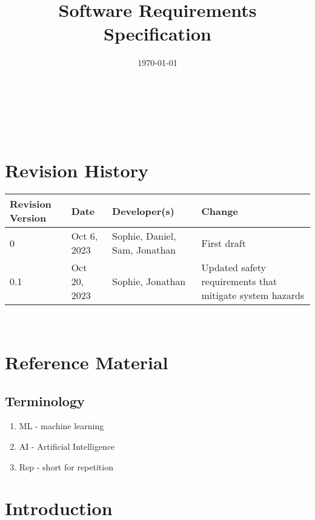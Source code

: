 \documentclass[12pt]{article}
\begin{document}
\title{Software Requirements Specification\\ \progname} 
\author{\authname}
\date{\today}
	
\maketitle

~\newpage


\tableofcontents

~\newpage

\section*{Revision History}

\begin{table}[hp]
		\centering
		\begin{tabularx}{\textwidth}{lllX}
			\toprule
			\textbf{Revision Version} & \textbf{Date} & \textbf{Developer(s)} & \textbf{Change}\\
			\midrule
			0 & Oct 6, 2023 & Sophie, Daniel, Sam, Jonathan & First draft\\
            \hline
            0.1 & Oct 20, 2023 & Sophie, Jonathan & Updated safety requirements that mitigate system hazards\\
			\bottomrule
		\end{tabularx}
	\end{table}


~\newpage

\section{Reference Material}

\subsection{Terminology}
\begin{enumerate}
    \item ML - machine learning
    \item AI - Artificial Intelligence 
    \item Rep - short for repetition 
\end{enumerate}


\section{Introduction}
\end{document}
